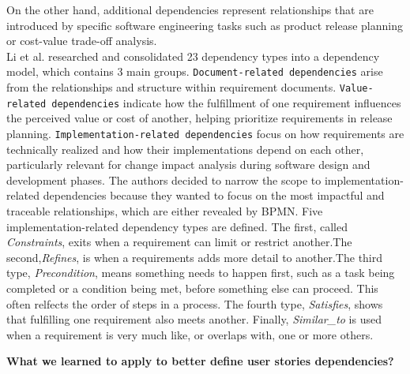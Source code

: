 \documentclass[a4paper, 11 pt, leqno, titlepage = true, toc=bib, oneside]{scrbook}
\begin{document}
On the other hand, additional dependencies represent relationships that are introduced by specific software engineering tasks such as product release planning or cost-value trade-off analysis.\\
Li et al.\cite{DBLP:conf/bpm/LiJFZWZX12} researched and consolidated 23 dependency types into a dependency model, which contains 3 main groups. \texttt{Document-related dependencies} arise from the relationships and structure within requirement documents. \texttt{Value-related dependencies} indicate how the fulfillment of one requirement influences the perceived value or cost of another, helping prioritize requirements in release planning. \texttt{Implementation-related dependencies} focus on how requirements are technically realized and how their implementations depend on each other, particularly relevant for change impact analysis during software design and development phases. The authors decided to narrow the scope to implementation-related dependencies because they wanted to focus on the most impactful and traceable relationships, which are either revealed by BPMN. Five implementation-related dependency types are defined. The first, called \textit{Constraints}, exits when a requirement can limit or restrict another.The second,\textit{Refines}, is when a requirements adds more detail to another.The third type, \textit{Precondition}, means something needs to happen first, such as a task being completed or a condition being met, before something else can proceed. This often relfects the order of steps in a process. The fourth type, \textit{Satisfies}, shows that fulfilling one requirement also meets another. Finally, \textit{Similar\_to} is used when a requirement is very much like, or overlaps with, one or more others.

\textbf{What we learned to apply to better define user stories dependencies?}
\end{document}
